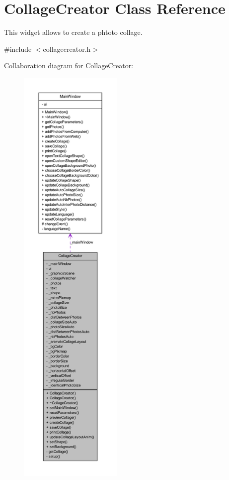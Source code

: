 \hypertarget{class_collage_creator}{
\section{CollageCreator Class Reference}
\label{class_collage_creator}
}


This widget allows to create a phtoto collage.  




{\ttfamily \#include $<$collagecreator.h$>$}



Collaboration diagram for CollageCreator:
\nopagebreak
\begin{figure}[H]
\begin{center}
\leavevmode
\includegraphics[height=600pt]{class_collage_creator__coll__graph}
\end{center}
\end{figure}
